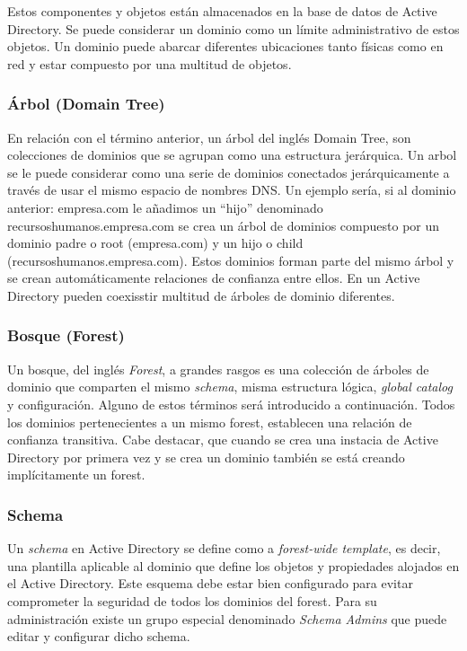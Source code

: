 Estos componentes y objetos están almacenados en la base de datos de Active Directory. Se puede considerar un dominio como un límite administrativo de estos objetos. Un dominio puede abarcar diferentes ubicaciones tanto físicas como en red y estar compuesto por una multitud de objetos.

\subsubsection{Árbol (Domain Tree)}

En relación con el término anterior, un árbol del inglés {Domain Tree}, son colecciones de dominios que se agrupan como una estructura jerárquica. Un arbol se le puede considerar como una serie de dominios conectados jerárquicamente a través de usar el mismo espacio de nombres DNS. Un ejemplo sería, si al dominio anterior: empresa.com le añadimos un ``hijo'' denominado recursoshumanos.empresa.com se crea un árbol de dominios compuesto por un dominio padre o root (empresa.com) y un hijo o child (recursoshumanos.empresa.com). Estos dominios forman parte del mismo árbol y se crean automáticamente relaciones de confianza entre ellos. En un Active Directory pueden coexisstir multitud de árboles de dominio diferentes. 

\subsubsection{Bosque (Forest)}

Un bosque, del inglés {\it Forest}, a grandes rasgos es una colección de árboles de dominio que comparten el mismo {\it schema}, misma estructura lógica, {\it global catalog} y configuración. Alguno de estos términos será introducido a continuación. Todos los dominios pertenecientes a un mismo forest, establecen una relación de confianza transitiva. Cabe destacar, que cuando se crea una instacia de Active Directory por primera vez y se crea un dominio también se está creando implícitamente un forest. 

\subsubsection{Schema}

Un {\it schema} en Active Directory se define como a {\it forest-wide template}, es decir, una plantilla aplicable al dominio que define los objetos y propiedades alojados en el Active Directory. Este esquema debe estar bien configurado para evitar comprometer la seguridad de todos los dominios del forest. Para su administración existe un grupo especial denominado {\it Schema Admins} que puede editar y configurar dicho schema. 

